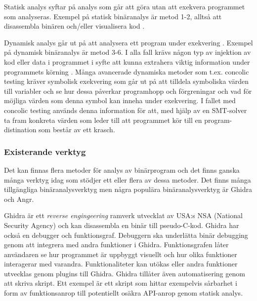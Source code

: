 Statisk analys syftar på analys som går att göra utan att exekvera programmet
som analyseras. Exempel på statisk binäranalys är metod 1-2, alltså att
disassembla binären och/eller visualisera kod \cite{dynamic_bin_analysis}.

Dynamisk analys går ut på att analysera ett program under exekvering
\cite{dynamic_bin_analysis}. Exempel på dynamisk binäranalys är metod 3-6. I
alla fall krävs någon typ av injektion av kod eller data i programmet i syfte
att kunna extrahera viktig information under programmets körning
\cite{dynamic_bin_analysis}. Många avancerade dynamiska metoder som t.ex.
concolic testing kräver symbolisk exekvering som går ut på att tilldela
symboliska värden till variabler och se hur dessa påverkar programhopp och
förgreningar och vad för möjliga värden som denna symbol kan inneha under
exekvering. I fallet med concolic testing används denna information för att,
med hjälp av en SMT-solver ta fram konkreta värden som leder till att
programmet kör till en program-distination som består av ett krasch.

\subsubsection{Existerande verktyg}
Det kan finnas flera metoder för analys av binärprogram och det finns ganska
många verktyg idag som stödjer ett eller flera av dessa metoder. Det finns
många tillgängliga binäranalysverktyg men några populära binäranalysverktyg är
Ghidra\cite{ghidra_website} och Angr\cite{angr_web}.



Ghidra är ett \emph{reverse engingeering} ramverk utvecklat av USA:s NSA
(National Security Agency) och kan disassembla en binär till pseudo-C-kod.
Ghidra har också en debugger och funktionsgraf. Debuggern ska underlätta binär
debugging genom att integrera med andra funktioner i Ghidra. Funktionsgrafen
låter användaren se hur programmet är uppbyggt visuellt och hur olika
funktioner interagerar med varandra. Funktionaliteter kan utökas eller andra
funktioner utvecklas genom plugins till Ghidra\cite{ghidra_use_cases}. Ghidra
tillåter även automatisering genom att skriva skript. Ett exempel är ett skript
som hittar exempelvis sårbarhet i form av funktionsanrop till potentiellt
osäkra API-anrop genom statisk analys\cite{ghidra_script}.

